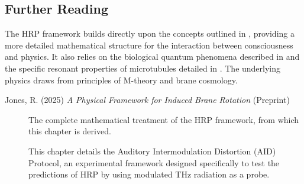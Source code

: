 \begin{importantbox}
\section*{Further Reading}
The HRP framework builds directly upon the concepts outlined in , providing a more detailed mathematical structure for the interaction between consciousness and physics. It also relies on the biological quantum phenomena described in  and the specific resonant properties of microtubules detailed in . The underlying physics draws from principles of M-theory and brane cosmology.

\begin{description}
    \item[Jones, R. (2025) \textit{A Physical Framework for Induced Brane Rotation} (Preprint)] The complete mathematical treatment of the HRP framework, from which this chapter is derived.
\end{description}

\begin{description}
    \item[] This chapter details the Auditory Intermodulation Distortion (AID) Protocol, an experimental framework designed specifically to test the predictions of HRP by using modulated THz radiation as a probe.
\end{description}
\end{importantbox}
